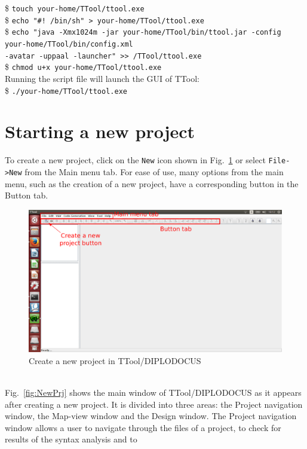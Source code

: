\documentclass{llncs}
\newcommand{\screenshotsize}{1.0\textwidth}
\begin{document}
\noindent
\$ \texttt{touch your-home/TTool/ttool.exe}\\
\$ \texttt{echo "\#! /bin/sh" > your-home/TTool/ttool.exe}\\
\$ \texttt{echo "java -Xmx1024m -jar your-home/TTool/bin/ttool.jar -config your-home/TTool/bin/config.xml\\-avatar -uppaal -launcher" >>
/TTool/ttool.exe}\\
\$ \texttt{chmod u+x your-home/TTool/ttool.exe}\\
%

\noindent
Running the script file will launch the GUI of TTool:\\
%

\noindent
\$ \texttt{./your-home/TTool/ttool.exe}
%
%
%
\newpage
\section{Starting a new project}
\label{sec:Project}
%
To create a new project, click on the \texttt{New} icon shown in Fig.~\ref{fig:CreatePrj} or select \texttt{File->New}
from the Main menu tab. For ease of use, many options from the main menu, such as the creation of a new project, have a
corresponding button in the Button tab.
%
\begin{figure}[htbp]
	\centering
	\includegraphics[width=\screenshotsize]{./figures/screenshot/begin.pdf}
	\caption{Create a new project in TTool/DIPLODOCUS}
	\label{fig:CreatePrj}
\end{figure}
%
\\Fig.~\ref{fig:NewPrj} shows the main window of TTool/DIPLODOCUS as it appears after creating a new project. It is
divided into three areas: the Project navigation window, the Map-view window and the Design window. The Project navigation
window allows a user to navigate through the files of a project, to check for results of the syntax analysis and to
\end{document}
